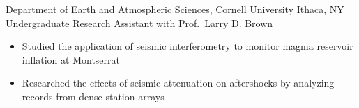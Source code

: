 
        {Department of Earth and Atmospheric Sciences, Cornell University}
        {Ithaca, NY}
        {Undergraduate Research Assistant}
        {with Prof.\ Larry D. Brown}{
    \begin{itemize}
        \item Studied the application of seismic interferometry to monitor magma reservoir
            inflation at Montserrat
        \item Researched the effects of seismic attenuation on aftershocks by analyzing records
            from dense station arrays
    \end{itemize}
}
